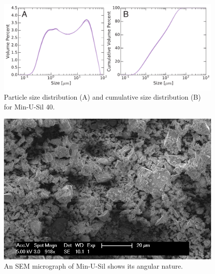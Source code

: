 \clearpage

\begin{figure}[H]
	\centering
		\includegraphics[scale=0.5]{chap_slow_slip_details/Figure_S1.pdf}
   	\caption{Particle size distribution (A) and cumulative size distribution (B) for Min-U-Sil 40.}
  	\label{Figure_S1}
\end{figure}

\clearpage

\begin{figure}[H]
	\centering
		\includegraphics[scale=0.5]{chap_slow_slip_details/Figure_S2.jpg}
   	\caption{An SEM micrograph of Min-U-Sil shows its angular nature.}
  	\label{Figure_S2}
\end{figure}

\clearpage


